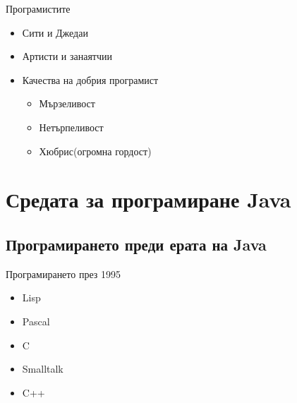 \documentclass{beamer}
\begin{document}
\begin{frame}{Програмистите}
  \transdissolve
  \begin{itemize}
  \item Сити и Джедаи
  \item Артисти и занаятчии
  \item Качества на добрия програмист
    \begin{itemize}
      \item Мързеливост
      \item Нетърпеливост
      \item Хюбрис(огромна гордост)
    \end{itemize}
  \end{itemize}
\end{frame}

\section{Средата за програмиране Java}
\subsection{Програмирането преди ерата на Java}

\begin{frame}{Програмирането през 1995}
  \transdissolve
  \begin{itemize}
    \item Lisp
    \item Pascal
    \item C
    \item Smalltalk
    \item C++
  \end{itemize}
\end{frame}
\end{document}
